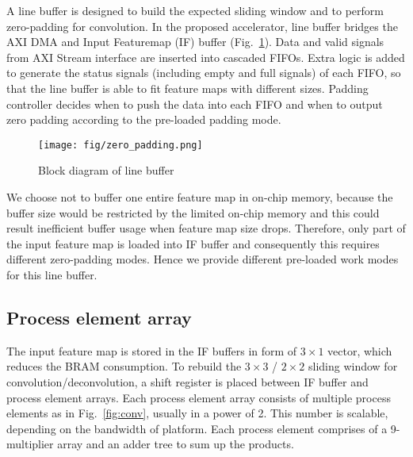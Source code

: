 \documentclass[conference]{IEEEtran}
\begin{document}
A line buffer is designed to build the expected sliding window and to perform zero-padding for convolution. In the proposed accelerator, line buffer bridges the AXI DMA and Input Featuremap (IF) buffer (Fig.~\ref{fig:zero_pad}). Data and valid signals from AXI Stream interface are inserted into cascaded FIFOs. Extra logic is added to generate the status signals (including empty and full signals) of each FIFO, so that the line buffer is able to fit feature maps with different sizes. Padding controller decides when to push the data into each FIFO and when to output zero padding according to the pre-loaded padding mode.

\begin{figure}[htbp]
	\centering
	\texttt{[image: fig/zero\_padding.png]}
	\caption{Block diagram of line buffer}
	\label{fig:zero_pad}
\end{figure}

We choose not to buffer one entire feature map in on-chip memory, because the buffer size would be restricted by the limited on-chip memory and this could result inefficient buffer usage when feature map size drops. Therefore, only part of the input feature map is loaded into IF buffer and consequently this requires different zero-padding modes. Hence we provide different pre-loaded work modes for this line buffer.

\begin{comment}
demonstrated in Fig.~\ref{fig:pad_scheme}. Each pink square represents one padding mode, where the white part is the content of input feature map and the grey part is the expected zero-padding. If including the no-padding mode, the line buffer supports 13 padding modes totally.
\end{comment}

\begin{comment}
\begin{figure}[htbp]
	\centering
	\texttt{[image: fig/padding\_scheme.png]}
	\caption{Zero padding modes}
	\label{fig:pad_scheme}
\end{figure}
\end{comment}


\subsection{Process element array}
The input feature map is stored in the IF buffers in form of $3\times 1$ vector, which reduces the BRAM consumption. To rebuild the $3\times 3$ / $2\times 2$ sliding window for convolution/deconvolution, a shift register is placed between IF buffer and process element arrays. Each process element array consists of multiple process elements as in Fig.~\ref{fig:conv}, usually in a power of 2. This number is scalable, depending on the bandwidth of platform. Each process element comprises of a 9-multiplier array and an adder tree to sum up the products.
\end{document}
